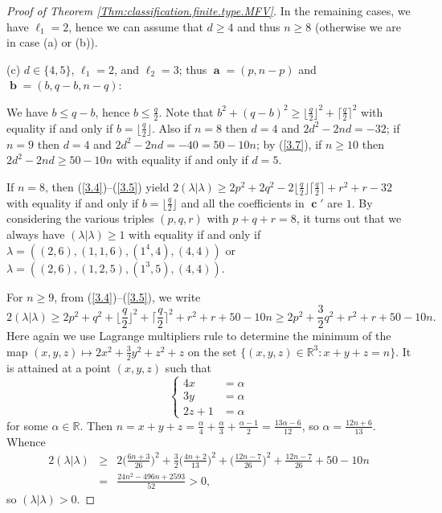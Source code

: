 \documentclass[12pt,reqno]{amsart}
\begin{document}
\begin{proof}[Proof  of Theorem \ref{Thm:classification.finite.type.MFV}]
\medskip

In the remaining cases, we have $\ell_1=2$, hence we can assume that $d\geq 4$ and thus $n\geq 8$ (otherwise we are in case (a) or (b)).

\bigskip
\noindent
(c) $d\in\{4,5\}$, $\ell_1=2$, and $\ell_2=3$;
thus $\mbfa=(p,n-p)$ and $\mbfb=(b,q-b,n-q)$:

We have $b\leq q-b$, hence $b\leq\frac{q}{2}$.
Note that $b^2+(q-b)^2\geq \lfloor\frac{q}{2}\rfloor^2+ \lceil\frac{q}{2}\rceil^2$ with equality if and only if $b=\lfloor\frac{q}{2}\rfloor$.
Also if $n=8$ then $d=4$ and $2d^2-2nd=-32$;
if $n=9$ then $d=4$ and $2d^2-2nd=-40=50-10n$;
by (\ref{3.7}), if $n\geq 10$ then $2d^2-2nd\geq 50-10n$ with equality if and only if $d=5$.

If $n=8$, then (\ref{3.4})--(\ref{3.5}) yield
$2(\lambda|\lambda)\geq 2p^2+2q^2-2\lfloor\frac{q}{2}\rfloor \lceil\frac{q}{2}\rceil+r^2+r-32$ with equality if and only if $b=\lfloor\frac{q}{2}\rfloor$
and all the coefficients in $\mbfc'$ are $1$.
By considering the various triples $(p,q,r)$ with $p+q+r=8$, it turns out that we always have $(\lambda|\lambda)\geq 1$ with equality if and only if
$\lambda=((2,6),(1,1,6),(1^4,4),(4,4))$ or
$\lambda=((2,6),(1,2,5),(1^3,5),(4,4))$. %

For $n\geq 9$, from (\ref{3.4})--(\ref{3.5}), we write
$$
2(\lambda|\lambda)
\geq 2p^2+q^2+\Big\lfloor \frac{q}{2} \Big\rfloor^2+\Big\lceil \frac{q}{2} \Big\rceil^2+r^2+r+50-10n
\geq 2p^2+\frac{3}{2}q^2+r^2+r+50-10n.
$$
Here again we use Lagrange multipliers rule to determine the minimum of the map $(x,y,z)\mapsto 2x^2+\frac{3}{2}y^2+z^2+z$
on the set $\{(x,y,z)\in\mathbb{R}^3:x+y+z=n\}$. It
is attained at a point $(x,y,z)$ such that
$$
\left\{\begin{array}{ll}
4x & = \alpha \\ 3y & =\alpha \\
2z+1 & =\alpha
\end{array}\right.
$$
for some $\alpha\in\mathbb{R}$.
Then $n=x+y+z=\frac{\alpha}{4}+\frac{\alpha}{3}+\frac{\alpha-1}{2}=\frac{13\alpha-6}{12}$, so $\alpha=\frac{12n+6}{13}$.
Whence
\begin{eqnarray*}
2(\lambda|\lambda) & \geq &   2\Big(\frac{6n+3}{26}\Big)^2+\frac{3}{2}\Big(\frac{4n+2}{13}\Big)^2+\Big(\frac{12n-7}{26}\Big)^2+\frac{12n-7}{26}+50-10n \\
 & = & \frac{24n^2-496n+2593}{52}>0,
\end{eqnarray*}
so $(\lambda|\lambda)>0$.


\end{proof}
\end{document}
